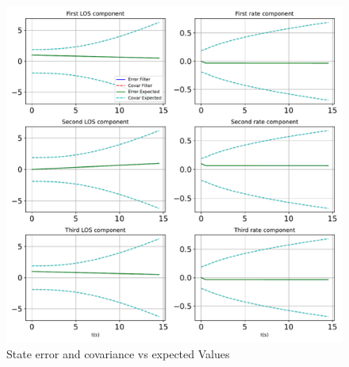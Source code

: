 \begin{figure}[htbp]\centerline{\includegraphics[height=0.9\textwidth, keepaspectratio]{AutoTeX/StatesCompare}}\caption{State error and covariance vs expected Values}\label{fig:StatesCompare}\end{figure}
